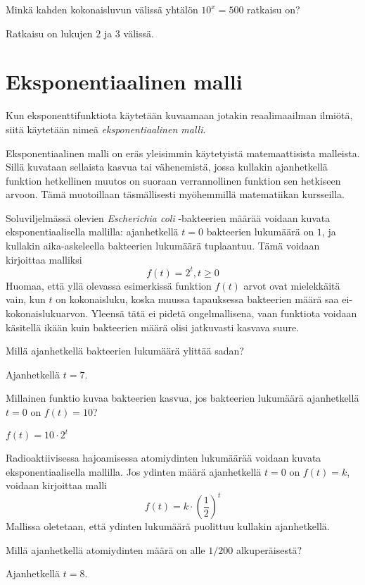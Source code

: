 \begin{tehtava}
Minkä kahden kokonaisluvun välissä yhtälön
$10^x = 500$ ratkaisu on?
\begin{vastaus}
Ratkaisu on lukujen $2$ ja $3$ välissä.
\end{vastaus}
\end{tehtava}

\section{Eksponentiaalinen malli}

Kun eksponenttifunktiota käytetään kuvaamaan jotakin reaalimaailman
ilmiötä, siitä käytetään nimeä \emph{eksponentiaalinen malli}.

Eksponentiaalinen malli on eräs yleisimmin käytetyistä matemaattisista
malleista. Sillä kuvataan sellaista kasvua tai vähenemistä, jossa
kullakin ajanhetkellä funktion hetkellinen muutos on suoraan
verrannollinen funktion sen hetkiseen arvoon. Tämä muotoillaan
täsmällisesti myöhemmillä matematiikan kursseilla.

\begin{esimerkki}
Soluviljelmässä olevien \emph{Escherichia coli} -bakteerien
määrää voidaan kuvata eksponentiaalisella mallilla: ajanhetkellä
$t = 0$ bakteerien lukumäärä on $1$, ja kullakin aika-askeleella
bakteerien lukumäärä tuplaantuu. Tämä voidaan
kirjoittaa malliksi
\[
f(t) = 2^t, t \ge 0
\]
Huomaa, että yllä olevassa esimerkissä funktion $f(t)$ arvot ovat
mielekkäitä vain, kun $t$ on kokonaisluku, koska
muussa tapauksessa bakteerien määrä saa ei-kokonaislukuarvon.
Yleensä tätä ei pidetä ongelmallisena, vaan funktiota voidaan käsitellä
ikään kuin bakteerien määrä olisi jatkuvasti kasvava suure.
\end{esimerkki}

\begin{tehtava}
Millä ajanhetkellä bakteerien lukumäärä ylittää sadan?
\begin{vastaus}
Ajanhetkellä $t = 7$.
\end{vastaus}
\end{tehtava}

\begin{tehtava}
Millainen funktio kuvaa bakteerien kasvua, jos bakteerien lukumäärä
ajanhetkellä $t = 0$ on $f(t) = 10$?
\begin{vastaus}
$f(t) = 10 \cdot 2^t$
\end{vastaus}
\end{tehtava}

\begin{esimerkki}
Radioaktiivisessa hajoamisessa atomiydinten lukumäärää voidaan
kuvata eksponentiaalisella mallilla. Jos ydinten määrä ajanhetkellä
$t = 0$ on $f(t) = k$, voidaan kirjoittaa malli
\[
f(t) = k \cdot \left( \frac{1}{2} \right)^t
\]
Mallissa oletetaan, että ydinten lukumäärä puolittuu kullakin ajanhetkellä.
\end{esimerkki}

\begin{tehtava}
Millä ajanhetkellä atomiydinten määrä on alle $1/200$ alkuperäisestä?
\begin{vastaus}
Ajanhetkellä $t = 8$.
\end{vastaus}
\end{tehtava}